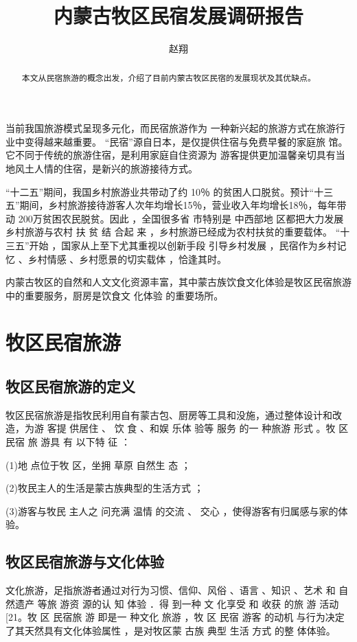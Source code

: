\documentclass[UTF8]{ctexart}
\title{内蒙古牧区民宿发展调研报告}
\author{赵翔}
\begin{document}
\maketitle
\begin{abstract}
本文从民宿旅游的概念出发，介绍了目前内蒙古牧区民宿的发展现状及其优缺点。
\end{abstract}

当前我国旅游模式呈现多元化，而民宿旅游作为 一种新兴起的旅游方式在旅游行业中变得越来越重要。
“民宿”源自日本，是仅提供住宿与免费早餐的家庭旅 馆。它不同于传统的旅游住宿，是利用家庭自住资源为 游客提供更加温馨亲切具有当地风土人情的住宿，是新兴的旅游接待方式。

“十二五”期间，我国乡村旅游业共带动了约 10％ 的贫困人口脱贫。预计“十三五”期间，乡村旅游接待游客人次年均增长15％，营业收入年均增长18％，每年带动 200万贫困农民脱贫。因此 ，全国很多省 市特别是 中西部地 区都把大力发展乡村旅游与农村 扶 贫 结 合起 来 ，乡村旅游已经成为农村扶贫的重要载体。 “十三五”开始 ，国家从上至下尤其重视以创新手段 引导乡村发展 ，民宿作为乡村记忆 、乡村情感 、乡村愿景的切实载体 ，恰逢其时。

内蒙古牧区的自然和人文文化资源丰富，其中蒙古族饮食文化体验是牧区民宿旅游中的重要服务，厨房是饮食文 化体验 的重要场所。
\section{牧区民宿旅游}
\subsection{牧区民宿旅游的定义}
牧区民宿旅游是指牧民利用自有蒙古包、厨房等工具和没施，通过整体设计和改造，为游 客提 供居住 、 饮 食 、和娱 乐体 验等 服务 的一 种旅游 形式 。牧 区 民宿 旅 游具 有 以下特 征 ：
 
(1)地 点位于牧 区，坐拥 草原 自然生 态 ； 

(2)牧民主人的生活是蒙古族典型的生活方式 ；

(3)游客与牧民 主人之 问充满 温情 的交流 、 交心 ，使得游客有归属感与家的体验。
\subsection{牧区民宿旅游与文化体验}
文化旅游，足指旅游者通过对行为习惯、信仰、风俗 、语言 、知识 、艺术 和 自然遗产 等旅 游资 源的认 知 体验 ．得 到一种 文 化享受 和 收获 的旅 游 活动[21。牧 区 民宿旅 游 即是一 种文化 旅游 ，牧 区 民宿 游客 的动机 与行为决定了其天然具有文化体验属性 ，是对牧区蒙 古族 典型 生活 方式 的整 体体验。
\end{document}
